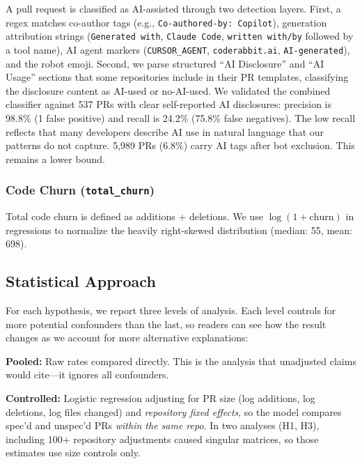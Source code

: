 \documentclass[a4paper,UKenglish,cleveref,autoref,thm-restate]{lipics-v2021}
\begin{document}
A pull request is classified as AI-assisted through two detection layers. First, a regex matches co-author tags (e.g., \texttt{Co-authored-by: Copilot}), generation attribution strings (\texttt{Generated with}, \texttt{Claude Code}, \texttt{written with/by} followed by a tool name), AI agent markers (\texttt{CURSOR\_AGENT}, \texttt{coderabbit.ai}, \texttt{AI-generated}), and the robot emoji. Second, we parse structured ``AI Disclosure'' and ``AI Usage'' sections that some repositories include in their PR templates, classifying the disclosure content as AI-used or no-AI-used. We validated the combined classifier against 537 PRs with clear self-reported AI disclosures: precision is 98.8\% (1 false positive) and recall is 24.2\% (75.8\% false negatives). The low recall reflects that many developers describe AI use in natural language that our patterns do not capture. 5,989 PRs (6.8\%) carry AI tags after bot exclusion. This remains a lower bound.

\subsubsection{Code Churn (\texttt{total\_churn})}

Total code churn is defined as additions + deletions. We use $\log(1 + \text{churn})$ in regressions to normalize the heavily right-skewed distribution (median: 55, mean: 698).

\subsection{Statistical Approach}

For each hypothesis, we report three levels of analysis. Each level controls for more potential confounders than the last, so readers can see how the result changes as we account for more alternative explanations:

\noindent
\textbf{Pooled:} Raw rates compared directly. This is the analysis that unadjusted claims would cite---it ignores all confounders.

\noindent
\textbf{Controlled:} Logistic regression adjusting for PR size (log additions, log deletions, log files changed) and \emph{repository fixed effects}, so the model compares spec'd and unspec'd PRs \emph{within the same repo}. In two analyses (H1, H3), including 100+ repository adjustments caused singular matrices, so those estimates use size controls only.
\end{document}
